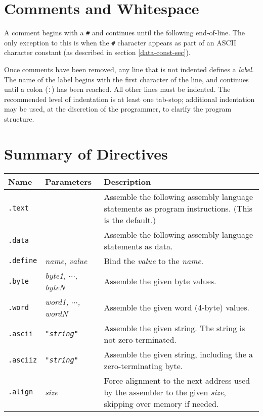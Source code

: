 
\section{Comments and Whitespace}

A comment begins with a \verb$#$ and continues until the following
end-of-line.  The only exception to this is when the \verb$#$
character appears as part of an ASCII character constant (as described
in section \ref{data-const-sec}).

Once comments have been removed, any line that is not indented defines
a {\em label}.  The name of the label begins with the first character
of the line, and continues until a colon ({\tt :}) has been reached. 
All other lines must be indented.  The recommended level of
indentation is at least one tab-stop; additional indentation may be
used, at the discretion of the programmer, to clarify the program
structure.

\section{Summary of Directives}

\vspace{3mm}
\noindent
\begin{tabular}{|ll|p{4.0in}|}
\hline
{\bf Name}      & {\bf Parameters}      & {\bf Description}     \\
\hline
{\tt .text}	&					&
		Assemble the following assembly language statements
		as program instructions.  (This is the default.)
		\\
{\tt .data}	&					&
		Assemble the following assembly language statements
		as data.
		\\
\hline
{\tt .define}	& {\em name}, {\em value}		&
		Bind the {\em value} to the {\em name}.
		\\
\hline
{\tt .byte}     & {\em byte1, $\cdots$, byteN }		&
		Assemble the given byte values.
		\\
{\tt .word}     & {\em word1, $\cdots$, wordN }		&
		Assemble the given word (4-byte) values.
		\\
{\tt .ascii}    & {\tt "{\em string}"}			&
		Assemble the given string.  The string is
		not zero-terminated.
		\\
{\tt .asciiz}   & {\tt "{\em string}"}			&
		Assemble the given string, including the
		a zero-terminating byte.
		\\
\hline
{\tt .align}	& {\em size}				&
		Force alignment to the next address
		used by the assembler to the given {\em size},
		skipping over memory if needed.
		\\
\hline
\end{tabular}
\vspace{3mm}


